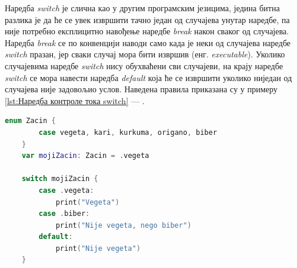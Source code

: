 \documentclass[12pt,oneside]{memoir}
\begin{document}
\indent Наредба \textit{switch} је слична као у другим програмским језицима, једина битна разлика је да ће се увек извршити тачно један од случајева унутар наредбе, па није потребно експлицитно навођење наредбе \textit{break} након сваког од случајева. Наредба \textit{break} се по конвенцији наводи само када је неки од случајева наредбе \textit{switch} празан, јер сваки случај мора бити извршив (енг. \textit{executable}). Уколико случајевима наредбе \textit{switch} нису обухваћени сви случајеви, на крају наредбе \textit{switch} се мора навести наредба \textit{default} која ће се извршити уколико ниједан од случајева није задовољио услов.  Наведена правила приказана су у примеру \ref{lst:Наредба контроле тока switch} --- .

\begin{lstlisting}[caption=\textit{{Наредба контроле тока switch}}, label={lst:Наредба контроле тока switch}, language=Swift, frame=single]
    enum Zacin {
        case vegeta, kari, kurkuma, origano, biber
    }
    var mojiZacin: Zacin = .vegeta
    
    switch mojiZacin {
        case .vegeta:
            print("Vegeta")
        case .biber:
            print("Nije vegeta, nego biber")
        default:
            print("Nije vegeta")
    }
\end{lstlisting}
\end{document}
